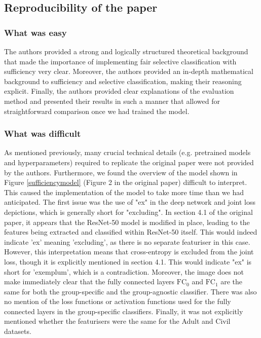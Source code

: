 \subsection{Reproducibility of the paper}

\subsubsection{What was easy}

The authors provided a strong and logically structured theoretical background that made the importance of implementing fair selective classification with
sufficiency very clear. Moreover, the authors provided an in-depth mathematical background to sufficiency and selective classification, making their reasoning explicit. Finally, the authors provided clear explanations of the evaluation method and presented their results in such a manner that allowed for straightforward comparison once we had trained the model.

\subsubsection{What was difficult} 
As mentioned previously, many crucial technical details (e.g. pretrained models and hyperparameters) required to replicate the original paper were not provided by the authors. Furthermore, we found the overview of the model shown in Figure \ref{sufficiencymodel} (Figure 2 in the original paper) difficult to interpret. This caused the implementation of the model to take more time than we had anticipated. The first issue was the use of "ex" in the deep network and joint loss depictions, which is generally short for "excluding". In section 4.1 of the original paper, it appears that the ResNet-50 model is modified in place, leading to the features being extracted and classified within ResNet-50 itself. This would indeed indicate 'ex' meaning 'excluding', as there is no separate featuriser in this case. However, this interpretation means that cross-entropy is excluded from the joint loss, though it is explicitly mentioned in section 4.1. This would indicate "ex" is short for 'exemplum', which is a contradiction. Moreover, the image does not make immediately clear that the fully connected layers $\text{FC}_0$ and $\text{FC}_1$ are the same for both the group-specific and the group-agnostic classifier. There was also no mention of the loss functions or activation functions used for the fully connected layers in the group-specific classifiers. Finally, it was not explicitly mentioned whether the featurisers were the same for the Adult and Civil datasets.

